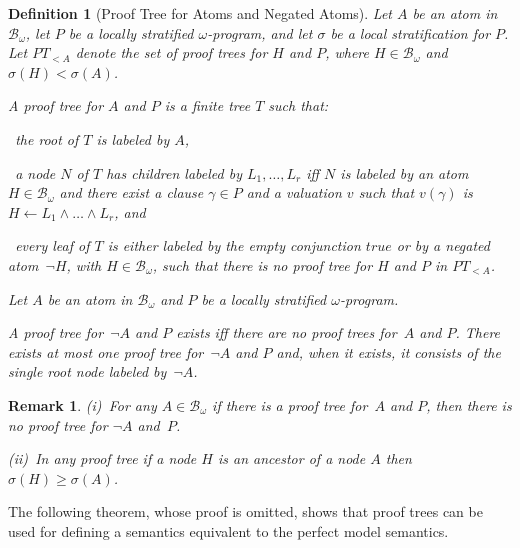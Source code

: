 \documentclass[english]{tlp}
\newtheorem{definition}{Definition} \newtheorem{example}{Example}       \newtheorem{remark}{Remark}
\renewcommand{\mathit}{\displaystyle}
\begin{document}
\begin{definition}[Proof Tree for Atoms and Negated Atoms]
\label{def:proof_tree}  Let \( A \) be an atom in
$\mathcal{B}_{\omega}$, let \( P \) be a locally stratified
$\omega$-program, and let \( \sigma \) be a local stratification for
\( P \). Let \( PT_{<A} \) denote the set of proof trees for \( H \) and
\( P \), where $H\in\mathcal{B}_{\omega}$ and \( \sigma (H)<\sigma
(A) \). 

\noindent
A \emph{proof tree} for \( A \) and \( P \) is a finite tree
\( T \) such that\/{\rm :} 

\hangindent=8mm\noindent
{}~the root of \( T \) is labeled by \( A \),

\noindent
{}~a node \( N \) of \( T \) has children labeled by  \(
L_{1},\ldots ,L_{r} \) iff \( N \) is labeled by an atom
\(H\in\mathcal{B}_{\omega}\) and there exist a clause \( \gamma \in
P \) and a valuation \( v \) such that \( v(\gamma ) \) is \(
H\leftarrow L_{1}\wedge \ldots \wedge L_{r} \), and 

\noindent
{}~every leaf
of \( T \) is either labeled by the empty conjunction \(
\mathit{true} \) or by a negated atom~\( \neg H \), with
\(H\in\mathcal{B}_{\omega}\), such that there is no proof tree for
\( H \) and \( P \) in \( PT_{<A} \).

\hangindent=0mm\smallskip
\noindent Let $A$ be an atom in $\mathcal{B}_{\omega}$
and \( P \) be a locally stratified
$\omega$-program. 

\noindent A \emph{proof tree} for~$\neg A$ and $P$ exists iff there are no proof
trees for~$A$ and $P$. There exists at most one proof tree 
for~$\neg A$ and $P$ and, when it exists, it consists of the single root node labeled by~$\neg A$.

\end{definition}

\vspace{-3mm} 
\noindent
\begin{remark}\label{rem:proof-tree} 
{\rm(i)}~For any 
$A\in\mathcal{B}_{\omega}$ 
if  there is a proof tree for~$A$ and $P$, then
there is no proof tree for $\neg A$ and~$P$.

\noindent
{\rm(ii)}~In any proof tree if a node $H$ is an ancestor of a 
node $A$ then
$\sigma(H) \geq \sigma (A)$.
\end{remark}

The following theorem, whose proof is omitted, shows that proof trees
can be used for defining a semantics equivalent to the perfect model
semantics.
\end{document}
